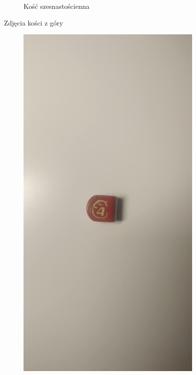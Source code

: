 \begin{figure}[h]
\begin{subfigure}{.3\textwidth}
        \caption{\label{fig:k16}Kość szesnastościenna}
      \end{subfigure}
    \caption{Zdjęcia kości z góry}
\end{figure}

\begin{figure}[h]
    \centering
      \begin{subfigure}{.45\textwidth}
        \includegraphics[width=.9\linewidth, trim={250mm 200mm 350mm 150mm}, clip]{chapters/02-teoria/figures/modern_k4}

\end{subfigure}
\end{figure}
